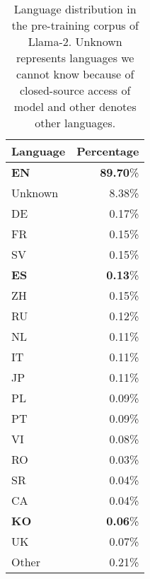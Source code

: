 \begin{table*}[ht]
\centering
\begin{tabular}{l r}
\hline
\textbf{Language} & \textbf{Percentage} \\
\hline
\textbf{EN}       & \textbf{89.70}\% \\
Unknown  & 8.38\%  \\
DE       & 0.17\%  \\
FR       & 0.15\%  \\
SV       & 0.15\%  \\
\textbf{ES}       & \textbf{0.13}\%  \\
ZH       & 0.15\%  \\
RU       & 0.12\%  \\
NL       & 0.11\%  \\
IT       & 0.11\%  \\
JP       & 0.11\%  \\
PL       & 0.09\%  \\
PT       & 0.09\%  \\
VI       & 0.08\%  \\
RO       & 0.03\%  \\
SR       & 0.04\%  \\
CA       & 0.04\%  \\
\textbf{KO}       & \textbf{0.06}\%  \\
UK       & 0.07\%  \\
Other    & 0.21\%  \\
\hline
\end{tabular}
\caption{Language distribution in the pre-training corpus of Llama-2. Unknown represents languages we cannot know because of closed-source access of model and other denotes other languages.}
\label{tab:llama_distribution}
\end{table*}


